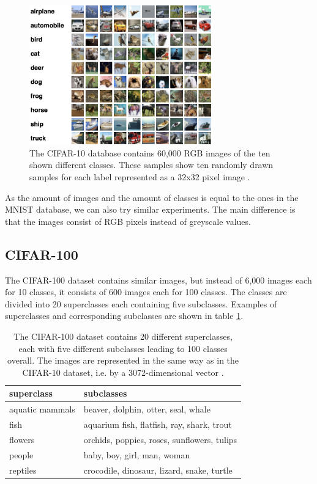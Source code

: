 \begin{figure}[h]
    \centering
    \includegraphics[width=0.7\textwidth]{images/cifar10}
    \caption{The CIFAR-10  database contains 60,000 RGB images of the ten shown different classes. These samples show ten randomly drawn samples for each label represented as a 32x32 pixel image \cite{Krizhevsky2009LearningML}.}
    \label{fig:cifar10}
\end{figure}

As the amount of images and the amount of classes is equal to the ones in the MNIST database, we can also try similar experiments. The main difference is that the images consist of RGB pixels instead of greyscale values.

\subsection{CIFAR-100}

The CIFAR-100 dataset contains similar images, but instead of 6,000 images each for 10 classes, it consists of 600 images each for 100 classes. The classes are divided into 20 superclasses each containing five subclasses. Examples of superclasses and corresponding subclasses are shown in table \ref{table:cifar100data}. 

\begin{table}[h]
    \centering
    \begin{tabular}{|l|l|}
    \hline
    superclass      & subclasses                                  \\ \hline
    aquatic mammals & beaver, dolphin, otter, seal, whale         \\
    fish            & aquarium fish, flatfish, ray, shark, trout  \\
    flowers         & orchids, poppies, roses, sunflowers, tulips \\
    people          & baby, boy, girl, man, woman                 \\ 
    reptiles        & crocodile, dinosaur, lizard, snake, turtle  \\ \hline               
    \end{tabular}
    \caption{The CIFAR-100 dataset contains 20 different superclasses, each with five different subclasses leading to 100 classes overall. The images are represented in the same way as in the CIFAR-10 dataset, i.e. by a 3072-dimensional vector \cite{Krizhevsky2009LearningML}.}
    \label{table:cifar100data}
\end{table}


